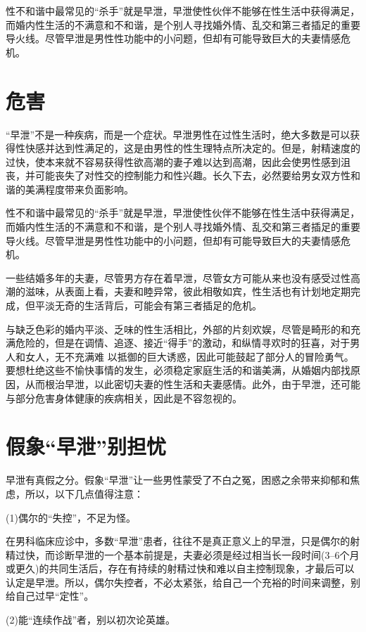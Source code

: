 \documentclass[12pt,UTF8]{ctexbook}
\begin{document}
性不和谐中最常见的“杀手”就是早泄，早泄使性伙伴不能够在性生活中获得满足，而婚内性生活的不满意和不和谐，是个别人寻找婚外情、乱交和第三者插足的重要导火线。尽管早泄是男性性功能中的小问题，但却有可能导致巨大的夫妻情感危机。

\section{危害}

“早泄”不是一种疾病，而是一个症状。早泄男性在过性生活时，绝大多数是可以获得性快感并达到性满足的，这是由男性的性生理特点所决定的。但是，射精速度的过快，使本来就不容易获得性欲高潮的妻子难以达到高潮，因此会使男性感到沮丧，并可能丧失了对性交的控制能力和性兴趣。长久下去，必然要给男女双方性和谐的美满程度带来负面影响。

性不和谐中最常见的“杀手”就是早泄，早泄使性伙伴不能够在性生活中获得满足，而婚内性生活的不满意和不和谐，是个别人寻找婚外情、乱交和第三者插足的重要导火线。尽管早泄是男性性功能中的小问题，但却有可能导致巨大的夫妻情感危机。

一些结婚多年的夫妻，尽管男方存在着早泄，尽管女方可能从来也没有感受过性高潮的滋味，从表面上看，夫妻和睦异常，彼此相敬如宾，性生活也有计划地定期完成，但平淡无奇的生活背后，可能会有第三者插足的危机。

与缺乏色彩的婚内平淡、乏味的性生活相比，外部的片刻欢娱，尽管是畸形的和充满危险的，但是在调情、追逐、接近“得手”的激动，和纵情寻欢时的狂喜，对于男人和女人，无不充满难
以抵御的巨大诱惑，因此可能鼓起了部分人的冒险勇气。要想杜绝这些不愉快事情的发生，必须稳定家庭生活的和谐美满，从婚姻内部找原因，从而根治早泄，以此密切夫妻的性生活和夫妻感情。此外，由于早泄，还可能与部分危害身体健康的疾病相关，因此是不容忽视的。

\section{假象“早泄”别担忧}

早泄有真假之分。假象“早泄”让一些男性蒙受了不白之冤，困惑之余带来抑郁和焦虑，所以，以下几点值得注意：

(1)偶尔的“失控”，不足为怪。

在男科临床应诊中，多数“早泄”患者，往往不是真正意义上的早泄，只是偶尔的射精过快，而诊断早泄的一个基本前提是，夫妻必须是经过相当长一段时间(3--6个月或更久)的共同生活后，存在有持续的射精过快和难以自主控制现象，才最后可以认定是早泄。所以，偶尔失控者，不必太紧张，给自己一个充裕的时间来调整，别给自己过早“定性”。

(2)能“连续作战”者，别以初次论英雄。
\end{document}
